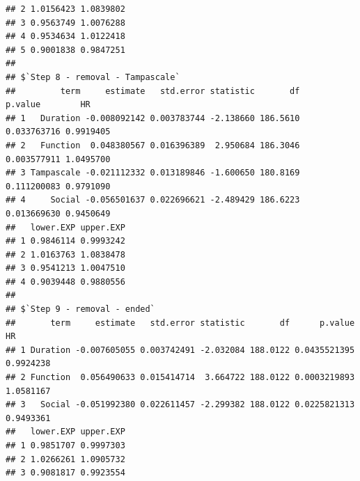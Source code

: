 \documentclass[
]{book}
\newenvironment{Shaded}{\begin{snugshade}}{\end{snugshade}}
\newcommand{\NormalTok}[1]{#1}
\newcommand{\OperatorTok}[1]{\textcolor[rgb]{0.81,0.36,0.00}{\textbf{#1}}}
\begin{document}
\begin{verbatim}
## 2 1.0156423 1.0839802
## 3 0.9563749 1.0076288
## 4 0.9534634 1.0122418
## 5 0.9001838 0.9847251
## 
## $`Step 8 - removal - Tampascale`
##         term     estimate   std.error statistic       df     p.value        HR
## 1   Duration -0.008092142 0.003783744 -2.138660 186.5610 0.033763716 0.9919405
## 2   Function  0.048380567 0.016396389  2.950684 186.3046 0.003577911 1.0495700
## 3 Tampascale -0.021112332 0.013189846 -1.600650 180.8169 0.111200083 0.9791090
## 4     Social -0.056501637 0.022696621 -2.489429 186.6223 0.013669630 0.9450649
##   lower.EXP upper.EXP
## 1 0.9846114 0.9993242
## 2 1.0163763 1.0838478
## 3 0.9541213 1.0047510
## 4 0.9039448 0.9880556
## 
## $`Step 9 - removal - ended`
##       term     estimate   std.error statistic       df      p.value        HR
## 1 Duration -0.007605055 0.003742491 -2.032084 188.0122 0.0435521395 0.9924238
## 2 Function  0.056490633 0.015414714  3.664722 188.0122 0.0003219893 1.0581167
## 3   Social -0.051992380 0.022611457 -2.299382 188.0122 0.0225821313 0.9493361
##   lower.EXP upper.EXP
## 1 0.9851707 0.9997303
## 2 1.0266261 1.0905732
## 3 0.9081817 0.9923554
\end{verbatim}

\begin{Shaded}
\end{Shaded}
\end{document}
